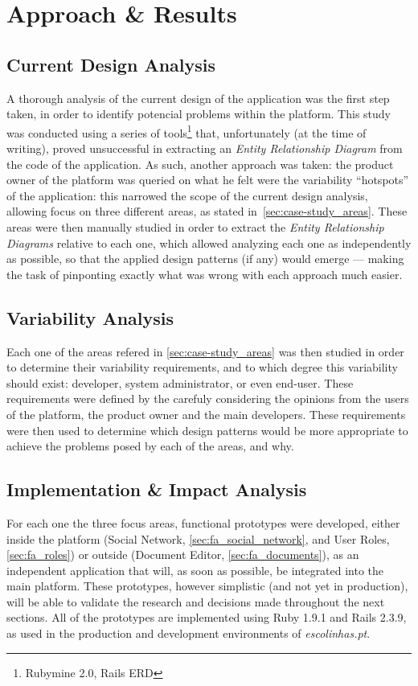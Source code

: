 \chapter{Approach \& Results}\label{chap:approach_results}

\section{Current Design Analysis}\label{sec:current_design_analysis}

A thorough analysis of the current design of the application was the first step taken, in order to identify potencial problems within the platform. This study was conducted using a series of tools\footnote{Rubymine 2.0\cite{rubymine}, Rails ERD\cite{rails_erd}} that, unfortunately (at the time of writing), proved unsuccessful in extracting an \emph{Entity Relationship Diagram} from the code of the application. As such, another approach was taken: the product owner of the platform was queried on what he felt were the variability ``hotspots'' of the application: this narrowed the scope of the current design analysis, allowing focus on three different areas, as stated in~\ref{sec:case-study_areas}. These areas were then manually studied in order to extract the \emph{Entity Relationship Diagrams} relative to each one, which allowed analyzing each one as independently as possible, so that the applied design patterns (if any) would emerge --- making the task of pinponting exactly what was wrong with each approach much easier.

\section{Variability Analysis}\label{sec:variability_analysis}

Each one of the areas refered in \ref{sec:case-study_areas} was then studied in order to determine their variability requirements, and to which degree this variability should exist: developer, system administrator, or even end-user. These requirements were defined by the carefuly considering the opinions from the users of the platform, the product owner and the main developers. These requirements were then used to determine which design patterns would be more appropriate to achieve the problems posed by each of the areas, and why.

\section{Implementation \& Impact Analysis}

For each one the three focus areas, functional prototypes were developed, either inside the platform (Social Network, \ref{sec:fa_social_network}, and User Roles, \ref{sec:fa_roles}) or outside (Document Editor, \ref{sec:fa_documents}), as an independent application that will, as soon as possible, be integrated into the main platform. These prototypes, however simplistic (and not yet in production), will be able to validate the research and decisions made throughout the next sections. All of the prototypes are implemented using Ruby 1.9.1 and Rails 2.3.9, as used in the production and development environments of \emph{escolinhas.pt}. 
